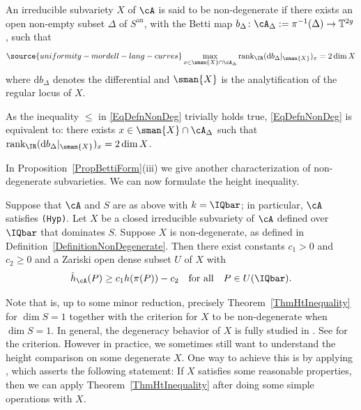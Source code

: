 \begin{definition}
\notready\label{DefinitionNonDegenerate}
An irreducible subvariety $X$ of $\cA$ is said to be non-degenerate if
there exists an open non-empty subset $\Delta$ of $S^{\mathrm{an}}$,
with the Betti map
$b_{\Delta} \colon \cA_{\Delta}:=\pi^{-1}(\Delta) \rightarrow \mathbb{T}^{2g}$,
such that
\begin{equation}\label{EqDefnNonDeg}
\source{uniformity-mordell-lang-curves}
\max_{x \in \sman{X} \cap \cA_{\Delta}} \mathrm{rank}_{\IR} (\mathrm{d}b_{\Delta}|_{\sman{X}})_x = 2\dim X
\end{equation}
where $\mathrm{d}b_\Delta$ denotes the differential and $\sman{X}$ is
the analytification of the regular locus of $X$.
\end{definition}

As the inequality $\le$ in \eqref{EqDefnNonDeg} trivially holds true, \eqref{EqDefnNonDeg} is equivalent to: there exists $x \in \sman{X} \cap \cA_{\Delta}$ such that $\mathrm{rank}_{\IR} (\mathrm{d}b_{\Delta}|_{\sman{X}})_x = 2\dim X$.


In Proposition~\ref{PropBettiForm}(iii) we give another characterization of non-degenerate
subvarieties. We can now formulate the height inequality.

\begin{theorem}
\notready\label{ThmHtInequality}
  Suppose that $\cA$ and $S$ are as above with $k=\IQbar$;
  in particular, $\cA$ satisfies {\tt (Hyp)}.
  Let $X$ be a closed irreducible subvariety of $\cA$
  defined over $\IQbar$ that dominates $S$.   Suppose $X$ is non-degenerate,
  as defined in Definition~\ref{DefinitionNonDegenerate}. Then there
  exist constants $c_1>0$ and $c_2\ge 0$ and a Zariski open dense subset
  $U$ of $X$ with
  \begin{equation*}
    \hat{h}_{\cA}(P) \ge c_1 h( \pi(P) ) - c_2 \quad \text{for all}\quad P \in U(\IQbar).
  \end{equation*}
\end{theorem}


Note that \cite[Theorem~1.4]{GaoHab} is, up to some minor reduction,
precisely Theorem~\ref{ThmHtInequality} for $\dim S = 1$ together with
the criterion for $X$ to be non-degenerate when $\dim S = 1$. In general, the degeneracy behavior of $X$ is fully studied in \cite{GaoBettiRank}. See \cite[Theorem~1.1]{GaoBettiRank} for the criterion. However in practice, we sometimes still want to understand the height comparison on some degenerate $X$. One way to achieve this is by applying \cite[Theorem~1.3]{GaoBettiRank}, which asserts the following statement: If $X$ satisfies some reasonable properties, then we can apply Theorem~\ref{ThmHtInequality} after doing some simple operations with $X$.

